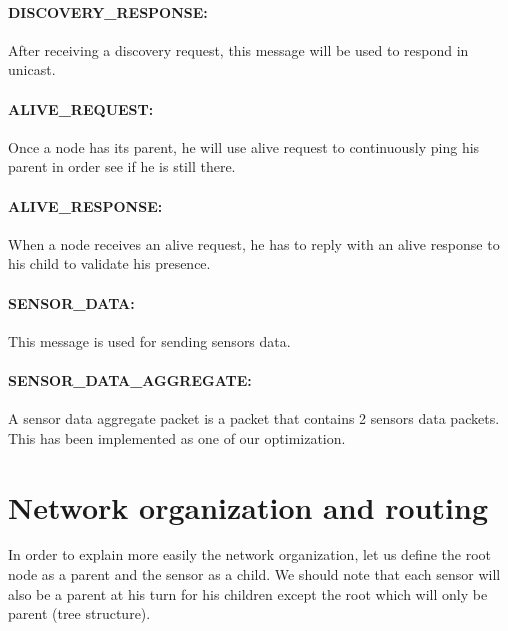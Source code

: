 \documentclass[a4paper,10pt]{article}
\begin{document}
\paragraph{DISCOVERY\_RESPONSE:} After receiving a discovery request, this message will be used to respond in unicast. 

\paragraph{ALIVE\_REQUEST:} Once a node has its parent, he will use alive request to continuously ping his parent in order see if he is still there.

\paragraph{ALIVE\_RESPONSE:} When a node receives an alive request, he has to reply with an alive response to his child to validate his presence. 

\paragraph{SENSOR\_DATA:} This message is used for sending sensors data. 

\paragraph{SENSOR\_DATA\_AGGREGATE:} A sensor data aggregate packet is a packet that contains 2 sensors data packets. This has been implemented as one of our optimization.

\section{Network organization and routing}
\label{routing}
In order to explain more easily the network organization, let us define the root node as a parent and the sensor as a child. We should note that each sensor will also be a parent at his turn for his children except the root which will only be parent (tree structure).
\end{document}
